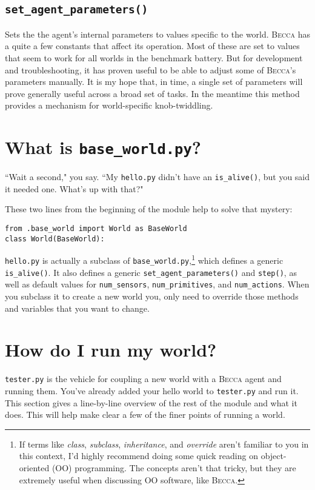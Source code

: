 \subsection{\texttt{set\_agent\_parameters()}}
Sets the the agent's internal parameters to values specific to the world. \textsc{Becca} has a quite a few constants that affect its operation. Most of these are set to values that seem to work for all worlds in the benchmark battery. But for development and troubleshooting, it has proven useful to be able to adjust some of \textsc{Becca}'s parameters manually. It is my hope that, in time, a single set of parameters will prove generally useful across a broad set of tasks. In the meantime this method provides a mechanism for world-specific knob-twiddling.

\section{What is \texttt{base\_world.py}?}
``Wait a second," you say. ``My \texttt{hello.py} didn't have an \texttt{is\_alive()}, but you said it needed one. What's up with that?"

These two lines from the beginning of the module help to solve that mystery:
\begin{verbatim}
from .base_world import World as BaseWorld
class World(BaseWorld):
\end{verbatim}

\texttt{hello.py} is actually a subclass of \texttt{base\_world.py},\footnote{If terms like {\em class}, {\em subclass}, {\em inheritance}, and {\em override} aren't familiar to you in this context, I'd highly recommend doing some quick reading on object-oriented (OO) programming. The concepts aren't that tricky, but they are extremely useful when discussing OO software, like \textsc{Becca}.} which defines a generic \texttt{is\_alive()}. It also defines a generic \texttt{set\_agent\_parameters()} and \texttt{step()}, as well as default values for  \texttt{num\_sensors}, \texttt{num\_primitives}, and \texttt{num\_actions}. When you subclass it to create a new world you, only need to override those methods and variables that you want to change.


\section{How do I run my world?}
\texttt{tester.py} is the vehicle for coupling a new world with a \textsc{Becca} agent and running them. You've already added your hello world to \texttt{tester.py} and run it. This section gives a line-by-line overview of the rest of the module and what it does. This will help make clear a few of the finer points of running a world.

